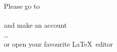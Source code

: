 \begin{frame}
  \centering\Large
  Please go to\\\textcolor{c2}{}\\and make an account
  \\\dots\\
  or open your favourite \LaTeX\ editor
\end{frame}
